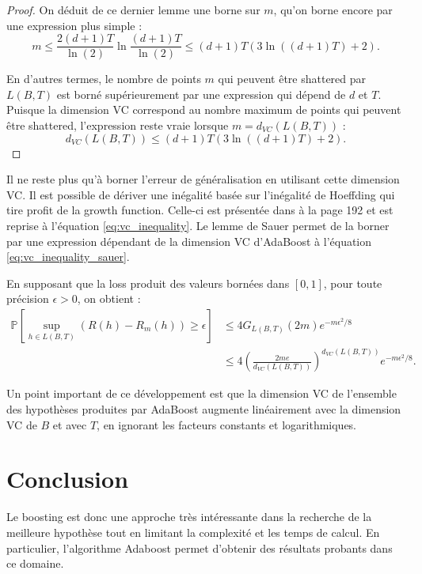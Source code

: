 \documentclass[12pt]{article}
\begin{document}
\begin{proof}
	On déduit de ce dernier lemme une borne sur $m$, qu'on borne encore par une expression plus simple :
	\[
	m \leq \frac{2 (d + 1) T}{\ln(2)} \ln \frac{(d + 1) T}{\ln(2)} \leq (d + 1) T (3 \ln((d + 1) T) + 2).
	\]
	
	En d'autres termes, le nombre de points $m$ qui peuvent être shattered par $L(B, T)$ est borné supérieurement par une expression qui dépend de $d$ et $T$.
	Puisque la dimension VC correspond au nombre maximum de points qui peuvent être shattered, l'expression reste vraie lorsque $m = d_{VC}(L(B, T))$ :
	\[
	d_{VC}(L(B, T)) \leq (d + 1) T (3 \ln((d + 1) T) + 2).
	\]
	\end{proof}

	Il ne reste plus qu'à borner l'erreur de généralisation en utilisant cette dimension VC.
	Il est possible de dériver une inégalité basée sur l'inégalité de Hoeffding qui tire profit de la growth function.
	Celle-ci est présentée dans \cite{Bousquet2003-oz} à la page 192 et est reprise à l'équation \ref{eq:vc_inequality}.
	Le lemme de Sauer permet de la borner par une expression dépendant de la dimension VC d'AdaBoost à l'équation \ref{eq:vc_inequality_sauer}.
	
	En supposant que la loss produit des valeurs bornées dans $[0, 1]$, pour toute précision $\epsilon > 0$, on obtient :
	\begin{align}
	\mathbb{P}\left[ \sup_{h \in L(B, T)} (R(h) - R_m(h)) \geq \epsilon \right] &\leq 4 G_{L(B, T)}(2 m) e^{-m \epsilon^2 / 8} \label{eq:vc_inequality} \\
	&\leq 4 \left( \frac{2 m e}{d_{VC}(L(B, T))} \right)^{d_{VC}(L(B, T))} e^{-m \epsilon^2 / 8}. \label{eq:vc_inequality_sauer}
	\end{align}

	Un point important de ce développement est que la dimension VC de l'ensemble des hypothèses produites par AdaBoost augmente linéairement avec la dimension VC de $B$ et avec $T$, en ignorant les facteurs constants et logarithmiques.
	
	\section*{Conclusion}
	
	Le boosting est donc une approche très intéressante dans la recherche de la meilleure hypothèse tout en limitant la complexité et les temps de calcul. En particulier, l'algorithme Adaboost permet d'obtenir des résultats probants dans ce domaine. 	
	
	
	
	
\end{document}
